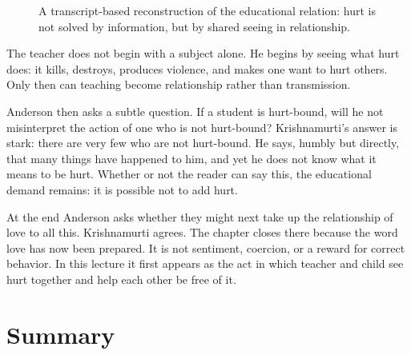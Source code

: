 \begin{figure}
\centering
{}
\caption{A transcript-based reconstruction of the educational relation: hurt is not solved by information, but by shared seeing in relationship.}
\end{figure}

The teacher does not begin with a subject alone. He begins by seeing what hurt does: it kills, destroys, produces violence, and makes one want to hurt others. Only then can teaching become relationship rather than transmission.

Anderson then asks a subtle question. If a student is hurt-bound, will he not misinterpret the action of one who is not hurt-bound? Krishnamurti's answer is stark: there are very few who are not hurt-bound. He says, humbly but directly, that many things have happened to him, and yet he does not know what it means to be hurt. Whether or not the reader can say this, the educational demand remains: it is possible not to add hurt.

At the end Anderson asks whether they might next take up the relationship of love to all this. Krishnamurti agrees. The chapter closes there because the word love has now been prepared. It is not sentiment, coercion, or a reward for correct behavior. In this lecture it first appears as the act in which teacher and child see hurt together and help each other be free of it.

\section{Summary}

